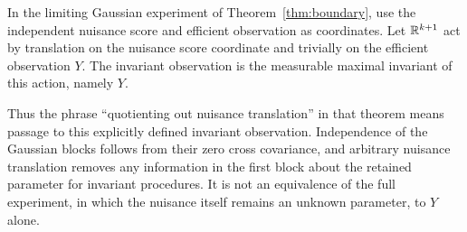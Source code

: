 \begin{definition}\label{def:nuisance-invariant}
In the limiting Gaussian experiment of Theorem~\ref{thm:boundary},
use the independent nuisance score and efficient observation as
coordinates. Let $\mathbb R^{k+1}$ act by translation on the nuisance score
coordinate and trivially on the efficient observation $Y$.
The invariant observation is the measurable maximal invariant of this
action, namely $Y$.
\end{definition}
Thus the phrase ``quotienting out nuisance translation'' in that theorem
means passage to this explicitly defined invariant observation.
Independence of the Gaussian blocks follows from their zero cross
covariance, and arbitrary nuisance translation removes any information
in the first block about the retained parameter for invariant
procedures. It is not an equivalence of the full experiment, in which
the nuisance itself remains an unknown parameter, to $Y$ alone.
